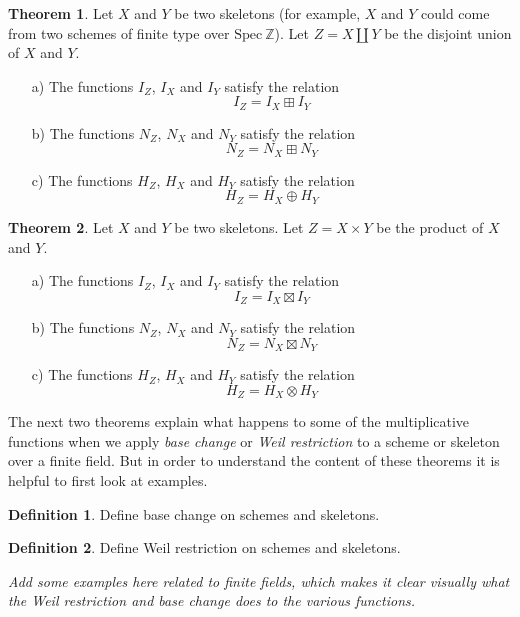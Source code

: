 \documentclass[a4paper]{article}
\theoremstyle{definition}
\newtheorem{theorem}{Theorem}[section]
\newtheorem{definition}{Definition}[section]
\theoremstyle{remark}
\newcommand{\Z}{\mathbb{Z}}
\newcommand{\Spec}{\mathrm{Spec}}
\begin{document}
\begin{theorem}
Let $X$ and $Y$ be two skeletons (for example, $X$ and $Y$ could come from two schemes of finite type over $\Spec \ \Z$). Let $Z = X \coprod Y$ be the disjoint union of $X$ and $Y$.
\begin{itemize}
\item[a)] The functions $I_Z$, $I_X$ and $I_Y$ satisfy the relation
$$  I_Z = I_X \boxplus I_Y   $$
\item[b)] The functions $N_Z$, $N_X$ and $N_Y$ satisfy the relation
$$  N_Z = N_X \boxplus N_Y   $$
\item[c)] The functions $H_Z$, $H_X$ and $H_Y$ satisfy the relation
$$  H_Z = H_X \oplus H_Y   $$

\end{itemize}
\end{theorem}


\begin{theorem}
Let $X$ and $Y$ be two skeletons. Let $Z = X \times Y$ be the product of $X$ and $Y$.
\begin{itemize}
\item[a)] The functions $I_Z$, $I_X$ and $I_Y$ satisfy the relation
$$  I_Z = I_X \boxtimes I_Y   $$
\item[b)] The functions $N_Z$, $N_X$ and $N_Y$ satisfy the relation
$$  N_Z = N_X \boxtimes N_Y   $$
\item[c)] The functions $H_Z$, $H_X$ and $H_Y$ satisfy the relation
$$  H_Z = H_X \otimes H_Y   $$

\end{itemize}
\end{theorem}

The next two theorems explain what happens to some of the multiplicative functions when we apply \emph{base change} or \emph{Weil restriction} to a scheme or skeleton over a finite field. But in order to understand the content of these theorems it is helpful to first look at examples.

\begin{definition}
Define base change on schemes and skeletons.
\end{definition}


\begin{definition}
Define Weil restriction on schemes and skeletons.
\end{definition}

\emph{Add some examples here related to finite fields, which makes it clear visually what the Weil restriction and base change does to the various functions.}
\end{document}
